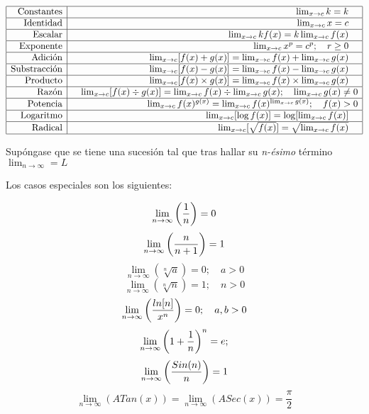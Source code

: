 $$\begin{array} {|r|r|}
		\hline  \text{Constantes}
		 & \quad\lim_{x\to c}k
		=k    \quad                                        \\
		\hline  \text{Identidad}
		 & \quad\lim_{x\to c}x
		=c    \quad                                        \\
		\hline  \text{Escalar}
		 & \quad\lim_{x\to c}kf(x)
		=k\lim_{x\to c}f(x)    \quad                       \\
		\hline  \text{Exponente}
		 & \quad\lim_{x\to c}x^p
		=c^p;    \quad r\ge0\quad                          \\
		\hline  \text{Adición}
		 & \quad\lim_{x\to c}[f(x)+g(x)]
		=\lim_{x\to c}f(x)+\lim_{x\to c}g(x)    \quad      \\
		\hline  \text{Substracción}
		 & \quad\lim_{x\to c}[f(x)-g(x)]
		=\lim_{x\to c}f(x)-\lim_{x\to c}g(x)    \quad      \\
		\hline  \text{Producto}
		 & \quad\lim_{x\to c}[f(x)\times g(x)]
		=\lim_{x\to c}f(x)\times\lim_{x\to c}g(x)    \quad \\
		\hline  \text{Razón}
		 & \quad\lim_{x\to c}[f(x)\div g(x)]
		=\lim_{x\to c}f(x)\div\lim_{x\to c}g(x);
		\quad \lim_{x\to c}g(x)\ne0                        \\
		\hline  \text{Potencia}
		 & \quad\lim_{x\to c}f(x)^{g(x)}
		=\lim_{x\to c}f(x)^{\lim_{x\to c}g(x)};
		\quad f(x)>0                                       \\
		\hline  \text{Logaritmo}
		 & \quad\lim_{x\to c}[\log f(x)]
		=\log[\lim_{x\to c}f(x)]    \quad                  \\
		\hline  \text{Radical}
		 & \quad\lim_{x\to c}[\sqrt{f(x)}]
		=\sqrt{\lim_{x\to c}f(x)}    \quad                 \\
		\hline
	\end{array}$$

Supóngase que se tiene una sucesión tal que tras hallar su \textit{n-ésimo} término $\lim_{n\to\infty}=L$

Los casos especiales son los siguientes:

$$
	\lim_{n\to\infty}\left( \frac1n \right)=0
$$ $$
	\lim_{n\to\infty}\left( \frac n{n+1} \right)=1
$$ $$
	\lim_{n\to\infty}(\sqrt[n]{a})=0;\quad a>0
$$ $$
	\lim_{n\to\infty}(\sqrt[n]n)=1;\quad n>0
$$ $$
	\lim_{n\to\infty}\left( \frac{ln[n]}{x^n} \right)=0;\quad a,b>0
$$ $$
	\lim_{n\to\infty}\left( 1+\frac1n \right)^n=e;
$$ $$
	\lim_{n\to\infty}\left( \frac{Sin(n)}n \right)=1
$$ $$
	\lim_{n\to\infty}(ATan(x))=\lim_{n\to\infty}(ASec(x))=\frac{\pi}2
$$

